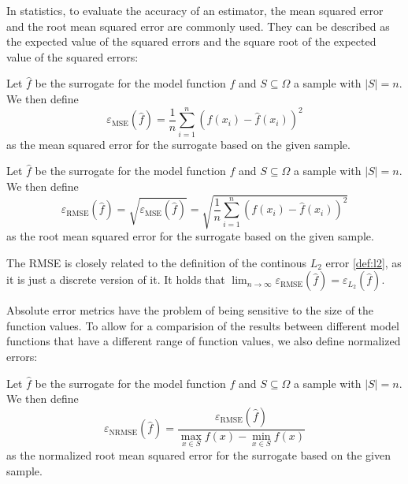 \documentclass[
  a4paper,  %
  twoside,  %
  bibliography=totoc,
  headsepline,
  cleardoublepage=empty,
  parskip=half,
  draft=false
]{scrbook}
\begin{document}
In statistics, to evaluate the accuracy of an estimator, the mean squared error and the root mean squared error are commonly used.
They can be described as the expected value of the squared errors and the square root of the expected value of the squared errors:
\begin{definition}
Let $\hat{f}$ be the surrogate for the model function $f$ and $S \subseteq \Omega$ a sample with $|S|=n$.
We then define
\begin{equation}
\varepsilon_{\text{MSE}}(\hat{f}) = \frac{1}{n} \sum_{i=1}^n (f(x_i) - \hat{f}(x_i))^2
\end{equation}
as the mean squared error for the surrogate based on the given sample.
\end{definition}

\begin{definition}
Let $\hat{f}$ be the surrogate for the model function $f$ and $S \subseteq \Omega$ a sample with $|S|=n$.
We then define
\begin{equation}
\varepsilon_{\text{RMSE}}(\hat{f}) = \sqrt{\varepsilon_{\text{MSE}}(\hat{f})} = \sqrt{\frac{1}{n} \sum_{i=1}^n (f(x_i) - \hat{f}(x_i))^2}
\end{equation}
as the root mean squared error for the surrogate based on the given sample.
\end{definition}

The RMSE is closely related to the definition of the continous $L_2$ error \cref{def:l2}, as it is just a discrete version of it.
It holds that $\lim_{n \to \infty} \varepsilon_{\text{RMSE}}(\hat{f}) = \varepsilon_{\text{$L_2$}}(\hat{f})$.


Absolute error metrics have the problem of being sensitive to the size of the function values.
To allow for a comparision of the results between different model functions that have a different range of function values, we also define normalized errors:
\begin{definition}
Let $\hat{f}$ be the surrogate for the model function $f$ and $S \subseteq \Omega$ a sample with $|S|=n$.
We then define
\begin{equation}
\varepsilon_{\text{NRMSE}}(\hat{f}) = \frac{\varepsilon_{\text{RMSE}}(\hat{f})}{\max_{x \in S} f(x) - \min_{x \in S} f(x)}
\end{equation}
as the normalized root mean squared error for the surrogate based on the given sample.
\end{definition}
\end{document}
